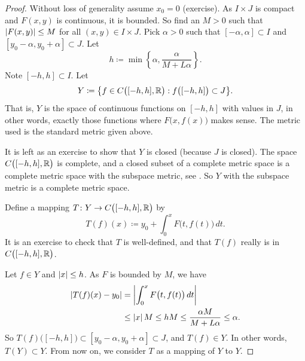 \begin{proof}
Without loss of generality assume $x_0 =0$ (exercise).
As $I \times J$ is compact and
$F(x,y)$ is continuous, it is bounded.
So find an $M > 0$ such that
$\left\lvert {F(x,y)} \right\rvert \leq M$ for all $(x,y) \in I\times J$.
Pick $\alpha > 0$ such that
$[-\alpha,\alpha] \subset I$ and $[y_0-\alpha, y_0 + \alpha] \subset J$.
Let
\begin{equation*}
h \coloneqq \min \left\{ \alpha, \frac{\alpha}{M+L\alpha} \right\} .
\end{equation*}
Note $[-h,h] \subset I$.  Let
\begin{equation*}
Y \coloneqq \bigl\{ f \in C\bigl([-h,h],{\mathbb{R}}\bigr) : f\bigl([-h,h]\bigr) \subset J \bigr\} .
\end{equation*}
That is, $Y$ is the space of continuous functions on $[-h,h]$ with values in
$J$, in other words,
exactly those functions where $F\bigl(x,f(x)\bigr)$ makes sense.
The metric used is the standard metric given above.

It is left as an exercise to show that $Y$ is closed (because $J$ is closed).
The space $C\bigl([-h,h],{\mathbb{R}}\bigr)$ is complete, and
a closed subset of a complete metric space is a complete metric space with
the subspace metric, see .  So $Y$ with the
subspace metric is a complete metric space.

Define a mapping
$T \colon Y \to C\bigl([-h,h],{\mathbb{R}}\bigr)$ by
\begin{equation*}
T(f)(x)
\coloneqq
y_0 + \int_0^x F\bigl(t,f(t)\bigr)\,dt .
\end{equation*}
It is an exercise to check that
$T$ is well-defined, and that $T(f)$ really is in $C\bigl([-h,h],{\mathbb{R}}\bigr)$.

Let $f \in Y$ and $\left\lvert {x} \right\rvert \leq h$.
As $F$ is bounded by $M$, we have
\begin{equation*}
\begin{split}
\left\lvert {T(f)(x) - y_0} \right\rvert
&= \left\lvert {\int_0^x F\bigl(t,f(t)\bigr)\,dt} \right\rvert \\
& \leq 
\left\lvert {x} \right\rvert M \leq hM \leq \frac{\alpha M}{M+ L\alpha} \leq \alpha .
\end{split}
\end{equation*}
So $T(f)\bigl([-h,h]\bigr) \subset [y_0-\alpha,y_0+\alpha] \subset J$, and
$T(f) \in Y$.  In other words, $T(Y) \subset Y$.  From now on,
we consider $T$ as a mapping of $Y$ to $Y$.


\end{proof}
